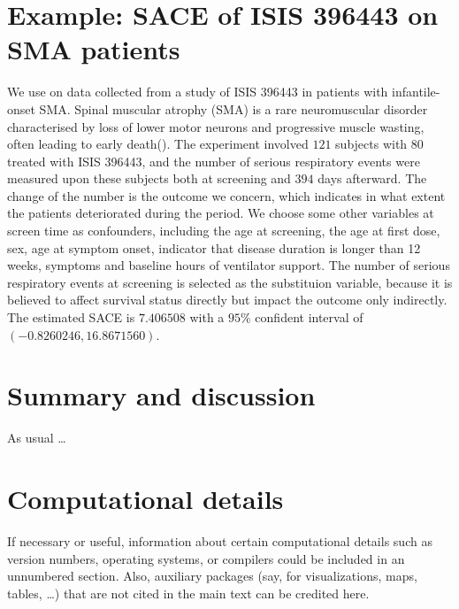 \documentclass[article]{jss}
\begin{document}
\section{Example: SACE of ISIS 396443 on SMA patients}\label{sec:example}
We use  on data collected from a study of ISIS 396443 in patients with infantile-onset SMA. Spinal muscular atrophy (SMA) is a rare neuromuscular disorder characterised by loss of lower motor neurons and progressive muscle wasting, often leading to early death(\cite{wiki:sma}). The experiment involved $121$ subjects with $80$ treated with ISIS 396443, and the number of serious respiratory events were measured upon these subjects both at screening and $394$ days afterward. The change of the number is the outcome we concern, which indicates in what extent the patients deteriorated during the period. We choose some other variables at screen time as confounders, including the age at screening, the age at first dose, sex, age at symptom onset, indicator that disease duration is longer than 12 weeks, symptoms and baseline hours of ventilator support. The number of serious respiratory events at screening is selected as the substituion variable, because it is believed to affect survival status directly but impact the outcome only indirectly. The estimated SACE is $7.406508$ with a $95\%$ confident interval of $(-0.8260246,16.8671560)$.


\section{Summary and discussion} \label{sec:summary}

\begin{leftbar}
As usual \dots
\end{leftbar}



\section*{Computational details}

\begin{leftbar}
If necessary or useful, information about certain computational details
such as version numbers, operating systems, or compilers could be included
in an unnumbered section. Also, auxiliary packages (say, for visualizations,
maps, tables, \dots) that are not cited in the main text can be credited here.
\end{leftbar}
\end{document}
